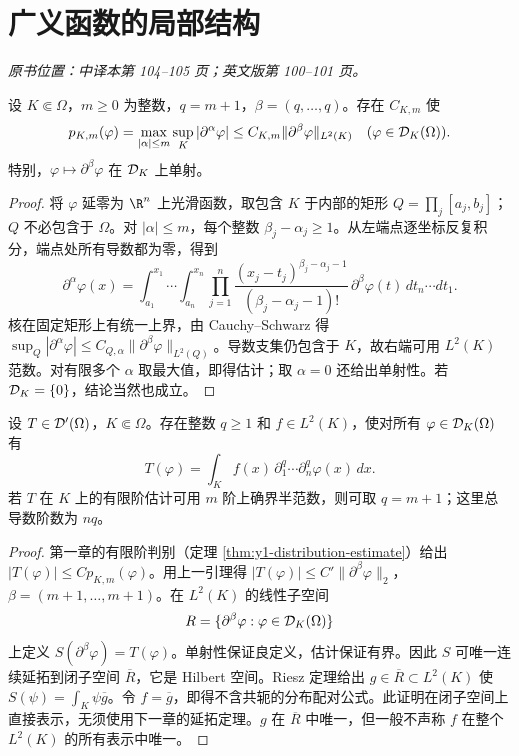 \section{广义函数的局部结构}\label{sec:yosida-03-11}
\noindent\textit{原书位置：中译本第 104--105 页；英文版第 100--101 页。}

\begin{lemma}[以一个高阶混合导数控制低阶导数]\label{lem:y3-mixed-estimate}
设 $K\Subset\Omega$，$m\ge0$ 为整数，$q=m+1$，$\beta=(q,\ldots,q)$。存在 $C_{K,m}$ 使
\[
 p_{K,m}(\varphi)=\max_{|\alpha|\le m}\sup_K|\partial^\alpha\varphi|
 \le C_{K,m}\|\partial^\beta\varphi\|_{L^2(K)}
 \quad(\varphi\in\mathcal{D}_K(\Omega)).
\]
特别，$\varphi\mapsto\partial^\beta\varphi$ 在 $\mathcal{D}_K$ 上单射。
\end{lemma}
\begin{proof}
将 $\varphi$ 延零为 $\R^n$ 上光滑函数，取包含 $K$ 于内部的矩形 $Q=\prod_j[a_j,b_j]$；$Q$ 不必包含于 $\Omega$。对 $|\alpha|\le m$，每个整数 $\beta_j-\alpha_j\ge1$。从左端点逐坐标反复积分，端点处所有导数都为零，得到
\[
 \partial^\alpha\varphi(x)
 =\int_{a_1}^{x_1}\!\cdots\!\int_{a_n}^{x_n}
 \prod_{j=1}^n\frac{(x_j-t_j)^{\beta_j-\alpha_j-1}}
 {(\beta_j-\alpha_j-1)!}\,
 \partial^\beta\varphi(t)\,dt_n\cdots dt_1.
\]
核在固定矩形上有统一上界，由 Cauchy--Schwarz 得 $\sup_Q|\partial^\alpha\varphi|\le C_{Q,\alpha}\|\partial^\beta\varphi\|_{L^2(Q)}$。导数支集仍包含于 $K$，故右端可用 $L^2(K)$ 范数。对有限多个 $\alpha$ 取最大值，即得估计；取 $\alpha=0$ 还给出单射性。若 $\mathcal{D}_K=\{0\}$，结论当然也成立。
\end{proof}

\begin{theorem}\label{thm:y3-local-structure}
设 $T\in\mathcal{D}'(\Omega)$，$K\Subset\Omega$。存在整数 $q\ge1$ 和 $f\in L^2(K)$，使对所有 $\varphi\in\mathcal{D}_K(\Omega)$ 有
\[
 T(\varphi)=\int_K f(x)\,
 \partial_1^q\cdots\partial_n^q\varphi(x)\,dx.
\]
若 $T$ 在 $K$ 上的有限阶估计可用 $m$ 阶上确界半范数，则可取 $q=m+1$；这里总导数阶数为 $nq$。
\end{theorem}
\begin{proof}
第一章的有限阶判别（定理 \ref{thm:y1-distribution-estimate}）给出 $|T(\varphi)|\le Cp_{K,m}(\varphi)$。用上一引理得
$|T(\varphi)|\le C'\|\partial^\beta\varphi\|_2$，$\beta=(m+1,\ldots,m+1)$。在 $L^2(K)$ 的线性子空间
\[
 R=\{\partial^\beta\varphi:\varphi\in\mathcal{D}_K(\Omega)\}
\]
上定义 $S(\partial^\beta\varphi)=T(\varphi)$。单射性保证良定义，估计保证有界。因此 $S$ 可唯一连续延拓到闭子空间 $\overline R$，它是 Hilbert 空间。Riesz 定理给出 $g\in\overline R\subset L^2(K)$ 使 $S(\psi)=\int_K\psi\overline g$。令 $f=\overline g$，即得不含共轭的分布配对公式。此证明在闭子空间上直接表示，无须使用下一章的延拓定理。$g$ 在 $\overline R$ 中唯一，但一般不声称 $f$ 在整个 $L^2(K)$ 的所有表示中唯一。
\end{proof}

